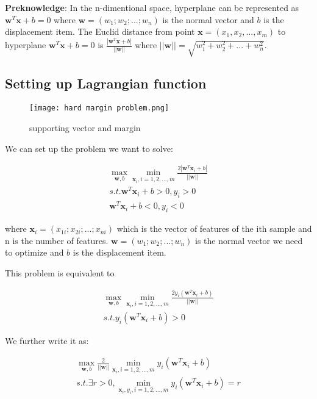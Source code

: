 \documentclass{article}
\begin{document}
\noindent \textbf{Preknowledge}: In the n-dimentional space, hyperplane can be represented as $ \boldsymbol{w}^T\boldsymbol{x} + b = 0$ where $\boldsymbol{w} = (w_1; w_2; ...; w_n)$ is the normal vector and $b$ is the displacement item. The Euclid distance from point $\boldsymbol{x} = (x_1, x_2, ..., x_m)$ to hyperplane $ \boldsymbol{w}^T\boldsymbol{x} + b = 0$ is $\frac{|\boldsymbol{w}^T\boldsymbol{x} + b|}{||\boldsymbol{w}||}$ where $||\boldsymbol{w}|| = \sqrt{w_1^2 + w_2^2 + ... + w_n^2}$.

\subsection{Setting up Lagrangian function}

\begin{figure}[H]
\centering
\texttt{[image: hard margin problem.png]}
\caption{supporting vector and margin}
\label{fig1}
\end{figure}

We can set up the problem we want to solve:

\begin{gather*}
\max_{\boldsymbol{w}, b} \min_{\boldsymbol{x}_i, i=1,2,...,m} \frac{2|\boldsymbol{w}^T\boldsymbol{x}_i + b|}{||\boldsymbol{w}||} \nonumber \\
s.t. \boldsymbol{w}^T\boldsymbol{x}_i + b > 0, y_i > 0 \\
\boldsymbol{w}^T\boldsymbol{x}_i + b < 0, y_i < 0
\end{gather*} 

where $\boldsymbol{x}_i = (x_{1i}; x_{2i}; ...; x_{ni})$ which is the vector of features of the ith sample and n is the number of features. $\boldsymbol{w} = (w_1; w_2; ...; w_n)$ is the normal vector we need to optimize and $b$ is the displacement item.

This problem is equivalent to

\begin{gather*}
\max_{\boldsymbol{w}, b} \min_{\boldsymbol{x}_i, i=1,2,...,m} \frac{2y_i(\boldsymbol{w}^T\boldsymbol{x}_i + b)}{||\boldsymbol{w}||} \nonumber \\
s.t. y_i(\boldsymbol{w}^T\boldsymbol{x}_i + b) > 0
\end{gather*} 

We further write it as:

\begin{gather*}
\max_{\boldsymbol{w}, b} \frac{2}{{||\boldsymbol{w}||}} \min_{\boldsymbol{x}_i, i=1,2,...,m} y_i(\boldsymbol{w}^T\boldsymbol{x}_i + b) \nonumber \\
s.t. \exists r > 0, \min_{\boldsymbol{x}_i, y_i, i=1,2,...,m} y_i(\boldsymbol{w}^T\boldsymbol{x}_i + b)=r
\end{gather*} 
\end{document}
